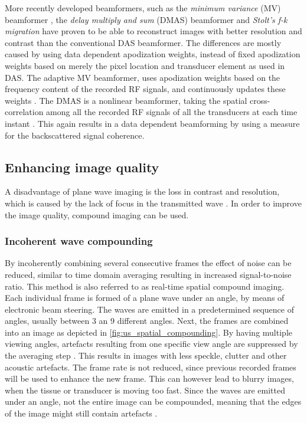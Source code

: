 More recently developed beamformers, such as the \textit{minimum variance} (MV) beamformer \cite{holfort_plane_2008}, the \textit{delay multiply and sum} (DMAS) beamformer \cite{matrone_delay_2015} and \textit{Stolt's f-k migration} \cite{garcia_stolts_2013} have proven to be able to reconstruct images with better resolution and contrast than the conventional DAS beamformer. The differences are mostly caused by using data dependent apodization weights, instead of fixed apodization weights based on merely the pixel location and transducer element as used in DAS. The adaptive MV beamformer, uses apodization weights based on the frequency content of the recorded RF signals, and continuously updates these weights \cite{holfort_plane_2008}. The DMAS is a nonlinear beamformer, taking the spatial cross-correlation among all the recorded RF signals of all the transducers at each time instant \cite{matrone_delay_2015}. This again results in a data dependent beamforming by using a measure for the backscattered signal coherence. %

\bigskip




\subsection{Enhancing image quality}
A disadvantage of plane wave imaging is the loss in contrast and resolution, which is caused by the lack of focus in the transmitted wave \cite{montaldo_coherent_2009}. In order to improve the image quality, compound imaging can be used. 


\subsubsection{Incoherent wave compounding}
By incoherently combining several consecutive frames the effect of noise can be reduced, similar to time domain averaging resulting in increased signal-to-noise ratio. This method is also referred to as real-time spatial compound imaging. Each individual frame is formed of a plane wave under an angle, by means of electronic beam steering. The waves are emitted in a predetermined sequence of angles, usually between 3 an 9 different angles. Next, the frames are combined into an image as depicted in \autoref{fig:us_spatial_compounding}. By having multiple viewing angles, artefacts resulting from one specific view angle are suppressed by the averaging step \cite{entrekin_real-time_2001}. This results in images with less speckle, clutter and other acoustic artefacts. The frame rate is not reduced, since previous recorded frames will be used to enhance the new frame. This can however lead to blurry images, when the tissue or transducer is moving too fast. Since the waves are emitted under an angle, not the entire image can be compounded, meaning that the edges of the image might still contain artefacts \cite{entrekin_real-time_2001}. 

